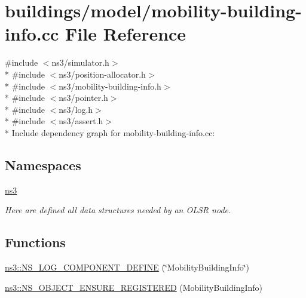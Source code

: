 \hypertarget{mobility-building-info_8cc}{}\section{buildings/model/mobility-\/building-\/info.cc File Reference}
\label{mobility-building-info_8cc}
{\ttfamily \#include $<$ns3/simulator.\+h$>$}\\*
{\ttfamily \#include $<$ns3/position-\/allocator.\+h$>$}\\*
{\ttfamily \#include $<$ns3/mobility-\/building-\/info.\+h$>$}\\*
{\ttfamily \#include $<$ns3/pointer.\+h$>$}\\*
{\ttfamily \#include $<$ns3/log.\+h$>$}\\*
{\ttfamily \#include $<$ns3/assert.\+h$>$}\\*
Include dependency graph for mobility-\/building-\/info.cc\+:
\subsection*{Namespaces}
\begin{DoxyCompactItemize}
\item 
 \hyperlink{namespacens3}{ns3}
\begin{DoxyCompactList}\small\item\em Here are defined all data structures needed by an O\+L\+SR node. \end{DoxyCompactList}\end{DoxyCompactItemize}
\subsection*{Functions}
\begin{DoxyCompactItemize}
\item 
\hyperlink{namespacens3_a972b9f74677b1c31a676a30c3094e5d3}{ns3\+::\+N\+S\+\_\+\+L\+O\+G\+\_\+\+C\+O\+M\+P\+O\+N\+E\+N\+T\+\_\+\+D\+E\+F\+I\+NE} (\char`\"{}Mobility\+Building\+Info\char`\"{})
\item 
\hyperlink{namespacens3_a4d5fd58a3063776c5d60120f831d11fd}{ns3\+::\+N\+S\+\_\+\+O\+B\+J\+E\+C\+T\+\_\+\+E\+N\+S\+U\+R\+E\+\_\+\+R\+E\+G\+I\+S\+T\+E\+R\+ED} (Mobility\+Building\+Info)
\end{DoxyCompactItemize}
